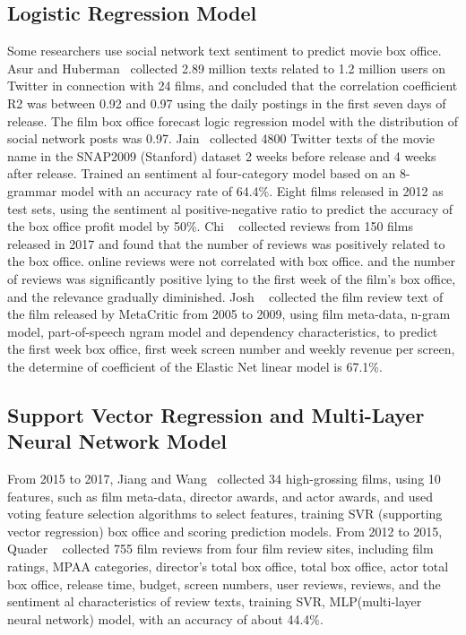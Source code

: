 \documentclass[review]{cvpr}
\begin{document}
\subsection{Logistic Regression Model}

Some researchers use social network text sentiment to predict movie box office.
Asur and Huberman~\cite{asur2010predicting} collected 2.89 million texts related to 1.2 million users on Twitter in connection with 24 films, and concluded that the correlation coefficient R2 was between 0.92 and 0.97 using the daily postings in the first seven days of release.
The film box office forecast logic regression model with the distribution of social network posts was 0.97.
Jain~\cite{jain2013prediction} collected 4800 Twitter texts of the movie name in the SNAP2009 (Stanford) dataset 2 weeks before release and 4 weeks after release.
Trained an sentiment al four-category model based on an 8-grammar model with an accuracy rate of 64.4\%.
Eight films released in 2012 as test sets, using the sentiment al positive-negative ratio to predict the accuracy of the box office profit model by 50\%.
Chi \etal~\cite{chi2019does} collected reviews from 150 films released in 2017 and found that the number of reviews was positively related to the box office.
online reviews were not correlated with box office. and the number of reviews was significantly positive lying to the first week of the film's box office, and the relevance gradually diminished.
Josh \etal~\cite{joshi2010movie} collected the film review text of the film released by MetaCritic from 2005 to 2009, using film meta-data, n-gram model, part-of-speech ngram model and dependency characteristics, to predict the first week box office,
first week screen number and weekly revenue per screen, the determine of coefficient of the Elastic Net linear model is 67.1\%.

\subsection{Support Vector Regression and Multi-Layer Neural Network Model}

From 2015 to 2017, Jiang and Wang~\cite{jiang2018predicting} collected 34 high-grossing films, using 10 features, such as film meta-data, director awards, and actor awards, and used voting feature selection algorithms to select features, training SVR (supporting vector regression) box office and scoring prediction models.
From 2012 to 2015, Quader \etal~\cite{quader2017machine} collected 755 film reviews from four film review sites, including film ratings, MPAA categories, director's total box office, total box office, actor total box office, release time, budget, screen numbers, user reviews, reviews, and the sentiment al characteristics of review texts,
training SVR, MLP(multi-layer neural network) model, with an accuracy of about 44.4\%.
\end{document}
